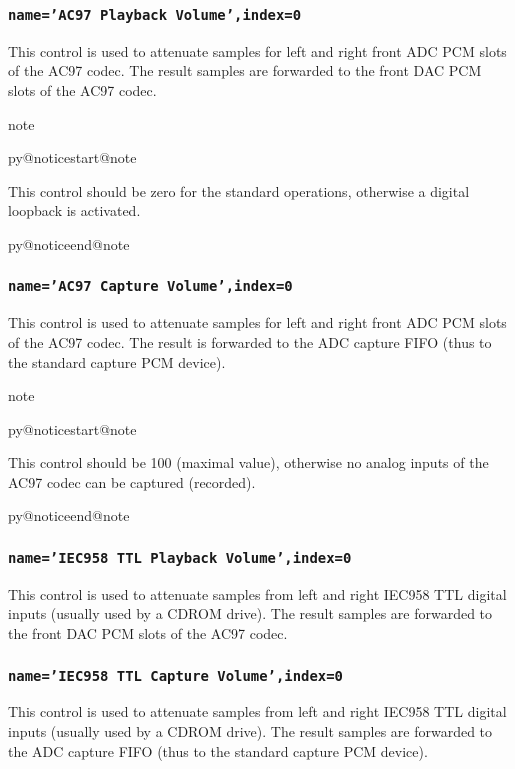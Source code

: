 \documentclass[a4paper,8pt,english]{sphinxmanual}
\makeatletter
\renewenvironment{notice}[2]{%
          \def\py@noticetype{#1}
          \begin{coloredbox}{#1}
          \bf\it
          \par\strong{#2}
          \csname py@noticestart@#1\endcsname
        }
	{
          \csname py@noticeend@\py@noticetype\endcsname
          \end{coloredbox}
        }
\makeatother
\begin{document}
\subsubsection{\texttt{name='AC97 Playback Volume',index=0}}
\label{sound/cards/sb-live-mixer:name-ac97-playback-volume-index-0}
This control is used to attenuate samples for left and right front ADC PCM slots
of the AC97 codec. The result samples are forwarded to the front DAC PCM
slots of the AC97 codec.

\begin{notice}{note}{Note:}
This control should be zero for the standard operations, otherwise
a digital loopback is activated.
\end{notice}


\subsubsection{\texttt{name='AC97 Capture Volume',index=0}}
\label{sound/cards/sb-live-mixer:name-ac97-capture-volume-index-0}
This control is used to attenuate samples for left and right front ADC PCM slots
of the AC97 codec. The result is forwarded to the ADC capture FIFO (thus to
the standard capture PCM device).

\begin{notice}{note}{Note:}
This control should be 100 (maximal value), otherwise no analog
inputs of the AC97 codec can be captured (recorded).
\end{notice}


\subsubsection{\texttt{name='IEC958 TTL Playback Volume',index=0}}
\label{sound/cards/sb-live-mixer:name-iec958-ttl-playback-volume-index-0}
This control is used to attenuate samples from left and right IEC958 TTL
digital inputs (usually used by a CDROM drive). The result samples are
forwarded to the front DAC PCM slots of the AC97 codec.


\subsubsection{\texttt{name='IEC958 TTL Capture Volume',index=0}}
\label{sound/cards/sb-live-mixer:name-iec958-ttl-capture-volume-index-0}
This control is used to attenuate samples from left and right IEC958 TTL
digital inputs (usually used by a CDROM drive). The result samples are
forwarded to the ADC capture FIFO (thus to the standard capture PCM device).
\end{document}
